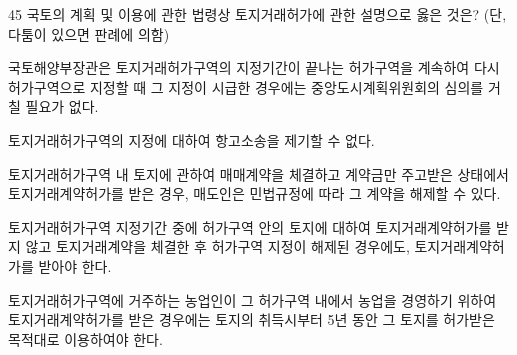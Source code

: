 \begin{question}{45}
국토의 계획 및 이용에 관한 법령상 토지거래허가에 관한 설명으로 옳은 것은? (단, 다툼이 있으면 판례에 의함)
\begin{choices}
  \item 국토해양부장관은 토지거래허가구역의 지정기간이 끝나는 허가구역을 계속하여 다시 허가구역으로 지정할 때 그 지정이 시급한 경우에는 중앙도시계획위원회의 심의를 거칠 필요가 없다.
  \item 토지거래허가구역의 지정에 대하여 항고소송을 제기할 수 없다.
  \item 토지거래허가구역 내 토지에 관하여 매매계약을 체결하고 계약금만 주고받은 상태에서 토지거래계약허가를 받은 경우, 매도인은 민법규정에 따라 그 계약을 해제할 수 있다.
  \item 토지거래허가구역 지정기간 중에 허가구역 안의 토지에 대하여 토지거래계약허가를 받지 않고 토지거래계약을 체결한 후 허가구역 지정이 해제된 경우에도, 토지거래계약허가를 받아야 한다.
  \item 토지거래허가구역에 거주하는 농업인이 그 허가구역 내에서 농업을 경영하기 위하여 토지거래계약허가를 받은 경우에는 토지의 취득시부터 5년 동안 그 토지를 허가받은 목적대로 이용하여야 한다.
\end{choices}
\end{question}
